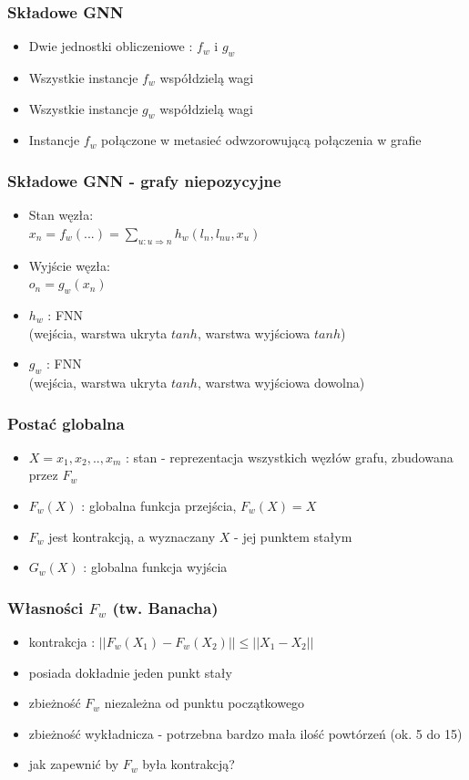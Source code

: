 \documentclass{beamer}
\begin{document}
\begin{frame}
\frametitle{Składowe GNN}
\begin{itemize}
	\item Dwie jednostki obliczeniowe : $f_w$ i $g_w$
	\item Wszystkie instancje $f_w$ współdzielą wagi
	\item Wszystkie instancje $g_w$ współdzielą wagi
	\item Instancje $f_w$ połączone w metasieć odwzorowującą połączenia w grafie
\end{itemize}
\end{frame}

\begin{frame}
\frametitle{Składowe GNN - grafy niepozycyjne}
\begin{itemize}
	\item Stan węzła:
	\\$x_n = f_w(...) = \sum_{u : u \Rightarrow n} h_w(l_n, l_{nu}, x_u)$
	\item Wyjście węzła:
	\\$o_n = g_w(x_n)$
\end{itemize}
\begin{itemize}
	\item $h_w$ : FNN\\(wejścia, warstwa ukryta $tanh$, warstwa wyjściowa $tanh$)
	\item $g_w$ : FNN\\(wejścia, warstwa ukryta $tanh$, warstwa wyjściowa dowolna)
\end{itemize}
\end{frame}

\begin{frame}
\frametitle{Postać globalna}
\begin{itemize}
	\item $X = {x_1, x_2, .., x_m}$ : stan - reprezentacja wszystkich węzłów grafu, zbudowana przez $F_w$
	\item $F_w(X)$ : globalna funkcja przejścia, $F_w(X) = X$
	\item $F_w$ jest kontrakcją, a wyznaczany $X$ - jej punktem stałym
	\item $G_w(X)$ : globalna funkcja wyjścia
\end{itemize}
\end{frame}

\begin{frame}
\frametitle{Własności $F_w$ (tw. Banacha)}
\begin{itemize}
	\item kontrakcja : $||F_w(X_1) - F_w(X_2)|| \leq ||X_1 - X_2||$
	\item posiada dokładnie jeden punkt stały
	\item zbieżność $F_w$ niezależna od punktu początkowego
	\item zbieżność wykładnicza - potrzebna bardzo mała ilość powtórzeń (ok. 5 do 15)
	\item jak zapewnić by $F_w$ była kontrakcją?
\end{itemize}
\end{frame}
\end{document}
